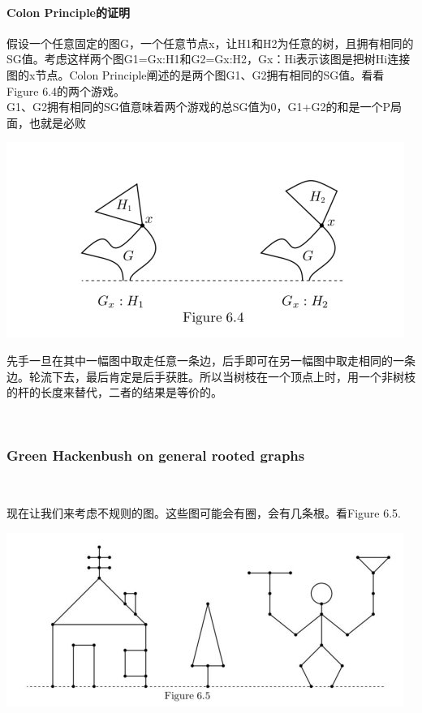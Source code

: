 	\paragraph{Colon Principle的证明}假设一个任意固定的图G，一个任意节点x，让H1和H2为任意的树，且拥有相同的SG值。考虑这样两个图G1=Gx:H1和G2=Gx:H2，Gx：Hi表示该图是把树Hi连接图的x节点。Colon Principle阐述的是两个图G1、G2拥有相同的SG值。看看Figure 6.4的两个游戏。\\
	G1、G2拥有相同的SG值意味着两个游戏的总SG值为0，G1+G2的和是一个P局面，也就是必败
	\begin{center}
		\includegraphics[scale=0.7]{./source/img8.jpg}
	\end{center}
	
	先手一旦在其中一幅图中取走任意一条边，后手即可在另一幅图中取走相同的一条边。轮流下去，最后肯定是后手获胜。所以当树枝在一个顶点上时，用一个非树枝的杆的长度来替代，二者的结果是等价的。
	
	~\\
	\subsubsection{Green Hackenbush on general rooted graphs}~
	
	现在让我们来考虑不规则的图。这些图可能会有圈，会有几条根。看Figure 6.5.
	\begin{center}
		\includegraphics{./source/img9.jpg}
	\end{center}
	
